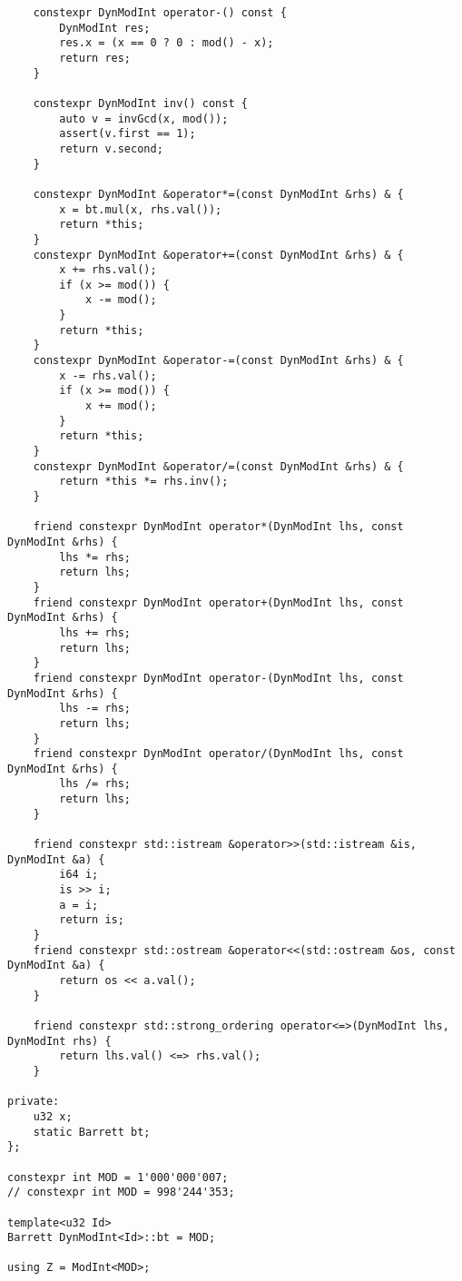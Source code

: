 \begin{lstlisting}
    constexpr DynModInt operator-() const {
        DynModInt res;
        res.x = (x == 0 ? 0 : mod() - x);
        return res;
    }
    
    constexpr DynModInt inv() const {
        auto v = invGcd(x, mod());
        assert(v.first == 1);
        return v.second;
    }
    
    constexpr DynModInt &operator*=(const DynModInt &rhs) & {
        x = bt.mul(x, rhs.val());
        return *this;
    }
    constexpr DynModInt &operator+=(const DynModInt &rhs) & {
        x += rhs.val();
        if (x >= mod()) {
            x -= mod();
        }
        return *this;
    }
    constexpr DynModInt &operator-=(const DynModInt &rhs) & {
        x -= rhs.val();
        if (x >= mod()) {
            x += mod();
        }
        return *this;
    }
    constexpr DynModInt &operator/=(const DynModInt &rhs) & {
        return *this *= rhs.inv();
    }
    
    friend constexpr DynModInt operator*(DynModInt lhs, const DynModInt &rhs) {
        lhs *= rhs;
        return lhs;
    }
    friend constexpr DynModInt operator+(DynModInt lhs, const DynModInt &rhs) {
        lhs += rhs;
        return lhs;
    }
    friend constexpr DynModInt operator-(DynModInt lhs, const DynModInt &rhs) {
        lhs -= rhs;
        return lhs;
    }
    friend constexpr DynModInt operator/(DynModInt lhs, const DynModInt &rhs) {
        lhs /= rhs;
        return lhs;
    }
    
    friend constexpr std::istream &operator>>(std::istream &is, DynModInt &a) {
        i64 i;
        is >> i;
        a = i;
        return is;
    }
    friend constexpr std::ostream &operator<<(std::ostream &os, const DynModInt &a) {
        return os << a.val();
    }
    
    friend constexpr std::strong_ordering operator<=>(DynModInt lhs, DynModInt rhs) {
        return lhs.val() <=> rhs.val();
    }
    
private:
    u32 x;
    static Barrett bt;
};

constexpr int MOD = 1'000'000'007;
// constexpr int MOD = 998'244'353;
 
template<u32 Id>
Barrett DynModInt<Id>::bt = MOD;
 
using Z = ModInt<MOD>;
\end{lstlisting}


